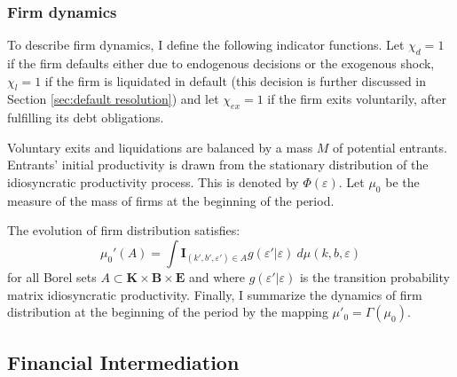 \documentclass[12pt]{article}
\begin{document}
\subsubsection{Firm dynamics}
To describe firm dynamics, I define the following indicator functions. Let $\chi_{d} = 1$ if the firm defaults either due to endogenous decisions or the exogenous shock, $\chi_l = 1$ if the firm is liquidated in default (this decision is further discussed in Section \ref{sec:default resolution}) and let $\chi_{ex} = 1$ if the firm exits voluntarily, after fulfilling its debt obligations. 

Voluntary exits and liquidations are balanced by a mass $M$ of potential entrants. Entrants' initial productivity is drawn from the stationary distribution of the idiosyncratic productivity process. This is denoted by $\Phi(\varepsilon)$. Let $\mu_0$ be the measure of the mass of firms at the beginning of the period. 

The evolution of firm distribution satisfies: 
\begin{equation} \label{eq_firmdim} 
	\mu_{0}'(A) = \int \mathbf{I}_{(k', b', \varepsilon') \in A} g(\varepsilon'|\varepsilon) \ d \mu (k,b,\varepsilon)
\end{equation}
for all Borel sets $A \subset \mathbf{K} \times \mathbf{B} \times \mathbf{E} $ and where $g(\varepsilon'|\varepsilon)$ is the transition probability matrix idiosyncratic productivity. Finally, I summarize the dynamics of firm distribution at the beginning of the period by the mapping $ \mu'_0 =\Gamma(\mu_0)$.


\subsection{Financial Intermediation}  \label{sec: Financial Intermediation}
\end{document}

